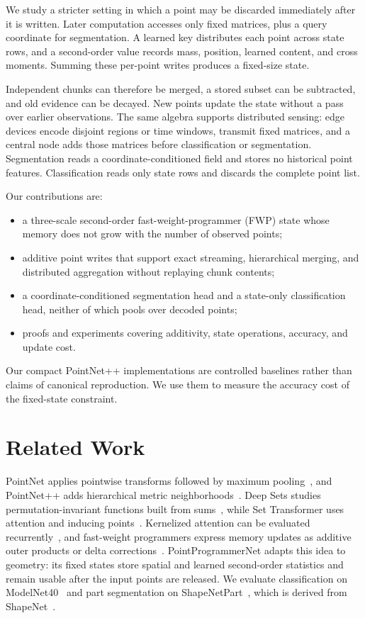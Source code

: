 \documentclass[times,twocolumn,final,authoryear]{elsarticle}
\begin{document}
We study a stricter setting in which a point may be discarded immediately after it is written. Later computation accesses only fixed matrices, plus a query coordinate for segmentation. A learned key distributes each point across state rows, and a second-order value records mass, position, learned content, and cross moments. Summing these per-point writes produces a fixed-size state.

Independent chunks can therefore be merged, a stored subset can be subtracted, and old evidence can be decayed. New points update the state without a pass over earlier observations. The same algebra supports distributed sensing: edge devices encode disjoint regions or time windows, transmit fixed matrices, and a central node adds those matrices before classification or segmentation. Segmentation reads a coordinate-conditioned field and stores no historical point features. Classification reads only state rows and discards the complete point list.

Our contributions are:
\begin{itemize}
\item a three-scale second-order fast-weight-programmer (FWP) state whose memory does not grow with the number of observed points;
\item additive point writes that support exact streaming, hierarchical merging, and distributed aggregation without replaying chunk contents;
\item a coordinate-conditioned segmentation head and a state-only classification head, neither of which pools over decoded points;
\item proofs and experiments covering additivity, state operations, accuracy, and update cost.
\end{itemize}
Our compact PointNet++ implementations are controlled baselines rather than claims of canonical reproduction. We use them to measure the accuracy cost of the fixed-state constraint.

\section{Related Work}
PointNet applies pointwise transforms followed by maximum pooling~\cite{qi2017pointnet}, and PointNet++ adds hierarchical metric neighborhoods~\cite{qi2017pointnetplusplus}. Deep Sets studies permutation-invariant functions built from sums~\cite{zaheer2017deepsets}, while Set Transformer uses attention and inducing points~\cite{lee2019settransformer}. Kernelized attention can be evaluated recurrently~\cite{katharopoulos2020transformers}, and fast-weight programmers express memory updates as additive outer products or delta corrections~\cite{schlag2021linear}. PointProgrammerNet adapts this idea to geometry: its fixed states store spatial and learned second-order statistics and remain usable after the input points are released. We evaluate classification on ModelNet40~\cite{wu20153dshapenets} and part segmentation on ShapeNetPart~\cite{yi2016scalable}, which is derived from ShapeNet~\cite{chang2015shapenet}.
\end{document}
